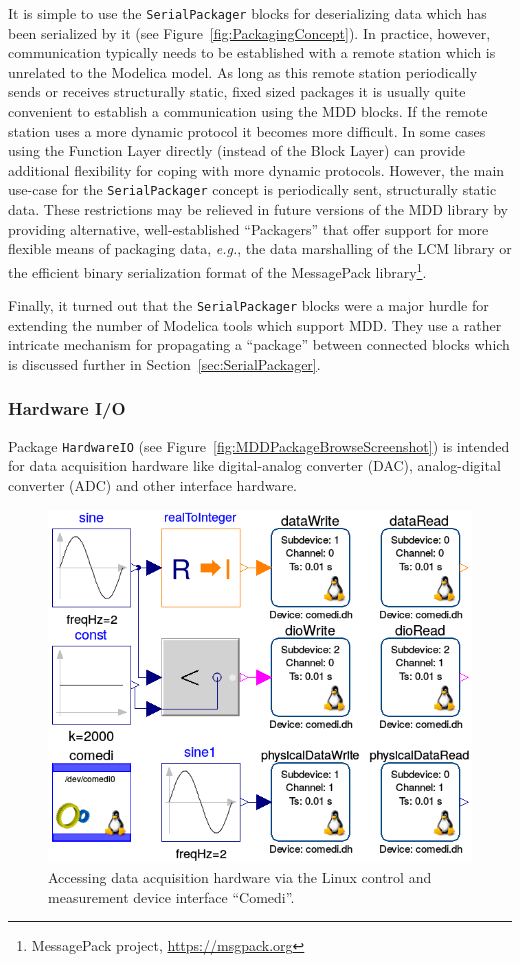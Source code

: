 \documentclass{resources/modelica}
\newcommand{\modelica}[1]{\lstinline[language=modelica]|#1|}
\begin{document}
It is simple to use the
\modelica{SerialPackager} blocks for deserializing data which has been serialized by it
(see Figure~\ref{fig:PackagingConcept}). In practice, however, communication
typically needs to be established with a remote station which is unrelated to
the Modelica model. As long as this remote station periodically sends or
receives structurally static, fixed sized packages it is usually quite
convenient to establish a communication using the MDD blocks. If the remote
station uses a more dynamic protocol it becomes more difficult. In some cases
using the \textsf{Function Layer} directly (instead of the \textsf{Block Layer})
can provide additional flexibility for coping with more dynamic protocols.
However, the main use-case for the \modelica{SerialPackager} concept is periodically
sent, structurally static data. These restrictions may be relieved in
future versions of the MDD library by providing alternative, well-established ``Packagers'' that offer support for more
flexible means of packaging data, \textit{e.g.}, the data marshalling of the LCM library or
the efficient binary serialization format of the MessagePack library\footnote{MessagePack project,
\url{https://msgpack.org}}.

Finally, it turned out that the \modelica{SerialPackager} blocks were a major hurdle for
extending the number of Modelica tools which support MDD. They use a rather
intricate mechanism for propagating a ``package'' between connected blocks
which is discussed further in Section~\ref{sec:SerialPackager}.

\subsubsection{Hardware I/O}

Package \modelica{HardwareIO} (see
Figure~\ref{fig:MDDPackageBrowseScreenshot}) is intended for data acquisition
hardware like digital-analog converter (DAC), analog-digital converter (ADC) and
other interface hardware.

\begin{figure}[htb]
  \centering
  \includegraphics[width=0.9\columnwidth]{figures/MDDComedi}
  \caption{Accessing data acquisition hardware via the Linux
  control and measurement device interface ``Comedi''.}
  \label{fig:MDDComedi}
\end{figure}
\end{document}
